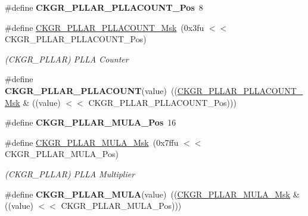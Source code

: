 \begin{DoxyCompactItemize}
\#define {\bfseries C\+K\+G\+R\+\_\+\+P\+L\+L\+A\+R\+\_\+\+P\+L\+L\+A\+C\+O\+U\+N\+T\+\_\+\+Pos}~8
\item 
\mbox{\label{group__SAME70__PMC_ga1f07433c2360f33bb966516a27e485f1}} 
\#define \mbox{\hyperlink{group__SAME70__PMC_ga1f07433c2360f33bb966516a27e485f1}{C\+K\+G\+R\+\_\+\+P\+L\+L\+A\+R\+\_\+\+P\+L\+L\+A\+C\+O\+U\+N\+T\+\_\+\+Msk}}~(0x3fu $<$$<$ C\+K\+G\+R\+\_\+\+P\+L\+L\+A\+R\+\_\+\+P\+L\+L\+A\+C\+O\+U\+N\+T\+\_\+\+Pos)
\begin{DoxyCompactList}\small\item\em (C\+K\+G\+R\+\_\+\+P\+L\+L\+AR) P\+L\+LA Counter \end{DoxyCompactList}\item 
\mbox{\label{group__SAME70__PMC_ga3d075b69defd1b528e1530c80b57172b}} 
\#define {\bfseries C\+K\+G\+R\+\_\+\+P\+L\+L\+A\+R\+\_\+\+P\+L\+L\+A\+C\+O\+U\+NT}(value)~((\mbox{\hyperlink{group__SAMV71__PMC_ga1f07433c2360f33bb966516a27e485f1}{C\+K\+G\+R\+\_\+\+P\+L\+L\+A\+R\+\_\+\+P\+L\+L\+A\+C\+O\+U\+N\+T\+\_\+\+Msk}} \& ((value) $<$$<$ C\+K\+G\+R\+\_\+\+P\+L\+L\+A\+R\+\_\+\+P\+L\+L\+A\+C\+O\+U\+N\+T\+\_\+\+Pos)))
\item 
\mbox{\label{group__SAME70__PMC_ga5435361dc5246da74e4019012ed9a474}} 
\#define {\bfseries C\+K\+G\+R\+\_\+\+P\+L\+L\+A\+R\+\_\+\+M\+U\+L\+A\+\_\+\+Pos}~16
\item 
\mbox{\label{group__SAME70__PMC_gac720bcb52bfadc5d76f43d76acce85c7}} 
\#define \mbox{\hyperlink{group__SAME70__PMC_gac720bcb52bfadc5d76f43d76acce85c7}{C\+K\+G\+R\+\_\+\+P\+L\+L\+A\+R\+\_\+\+M\+U\+L\+A\+\_\+\+Msk}}~(0x7ffu $<$$<$ C\+K\+G\+R\+\_\+\+P\+L\+L\+A\+R\+\_\+\+M\+U\+L\+A\+\_\+\+Pos)
\begin{DoxyCompactList}\small\item\em (C\+K\+G\+R\+\_\+\+P\+L\+L\+AR) P\+L\+LA Multiplier \end{DoxyCompactList}\item 
\mbox{\label{group__SAME70__PMC_ga0784e6083209f155caeea714db658656}} 
\#define {\bfseries C\+K\+G\+R\+\_\+\+P\+L\+L\+A\+R\+\_\+\+M\+U\+LA}(value)~((\mbox{\hyperlink{group__SAMV71__PMC_gac720bcb52bfadc5d76f43d76acce85c7}{C\+K\+G\+R\+\_\+\+P\+L\+L\+A\+R\+\_\+\+M\+U\+L\+A\+\_\+\+Msk}} \& ((value) $<$$<$ C\+K\+G\+R\+\_\+\+P\+L\+L\+A\+R\+\_\+\+M\+U\+L\+A\+\_\+\+Pos)))

\end{DoxyCompactItemize}

